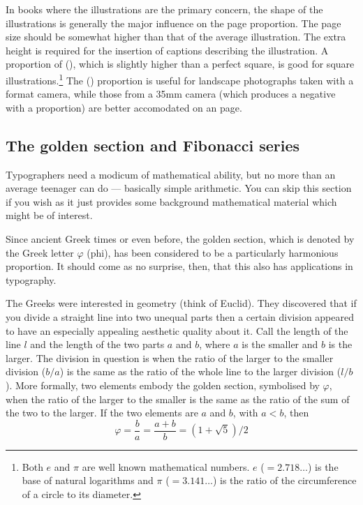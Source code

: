\documentclass[10pt,letterpaper,extrafontsizes]{memoir}
\begin{document}
    In books where the illustrations are the primary 
concern, the shape of the illustrations is generally 
the major influence on the page proportion.
The page size should be somewhat higher than that of the average 
illustration. The extra height is required for the 
insertion of captions describing the
illustration. 
A proportion of  (), 
which is slightly higher
than a perfect square, is good for square illustrations.\footnote{Both $e$
and $\pi$ are well known mathematical numbers. $e$ ($= 2.718 \ldots$)
is the base of natural logarithms and $\pi$ ($= 3.141 \ldots$) is the
ratio of the circumference of a circle to its diameter.}
The 
() proportion is useful for landscape 
photographs  taken with a 
format camera, while those from a 35mm camera (which produces a negative
with a  proportion) are better accomodated on 
an  page.

\subsection{The golden section and Fibonacci series}

    Typographers need a modicum of mathematical ability, but no more
than an average teenager can do --- basically simple arithmetic. You can
skip this section if you wish as it just provides some background 
mathematical material which might be of interest.

    Since ancient Greek times or even before, the golden section, which
is denoted by the Greek letter $\varphi$ (phi), has been considered to be
a particularly harmonious proportion. It should come as no surprise, then,
that this also has applications in typography.

    The Greeks were interested in geometry (think of Euclid). They discovered
that if you divide a straight line into two unequal parts then a certain
division appeared to have an especially appealing aesthetic quality about it. 
Call the length of the line $l$ and the length of the two parts $a$ and $b$, 
where $a$ is the smaller and $b$ is the larger. The division in question
is when the ratio of the larger to the smaller division ($b/a$) is the same
as the ratio of the whole line to the larger division ($l/b$).
More formally, two elements embody the golden section, symbolised by
$\varphi$, when the ratio of the larger
to the smaller is the same as the ratio of the sum of the two to the larger.
If the two elements are $a$ and $b$, with $a < b$, then
\begin{equation}
\varphi = \frac{b}{a} = \frac{a+b}{b} = (1+\sqrt{5})/2
\end{equation}
\end{document}
